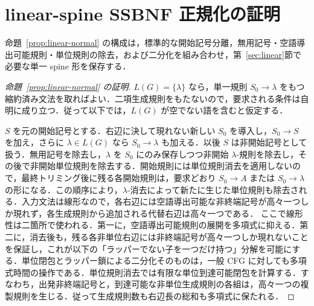 \documentclass[11pt,a4paper]{ltjsarticle}
\theoremstyle{remark}
\theoremstyle{plain}
\begin{document}
\section{linear-spine SSBNF 正規化の証明}
\label{app:linear-normalization}

命題~\ref{prop:linear-normal} の構成は，標準的な開始記号分離，無用記号・空語導出可能規則・単位規則の除去，および二分化を組み合わせ，第~\ref{sec:linear}節で必要な単一 spine 形を保存する．

\begin{proof}[命題~\ref{prop:linear-normal} の証明]
$L(G)=\{\lambda\}$ なら，単一規則 $S_0\to\lambda$ をもつ縮約済み文法を取ればよい．二項生成規則をもたないので，要求される条件は自明に成り立つ．従って以下では，$L(G)$ が空でない語を含むと仮定する．

$S$ を元の開始記号とする．右辺に決して現れない新しい $S_0$ を導入し，$S_0\to S$ を加え，さらに $\lambda\in L(G)$ なら $S_0\to\lambda$ も加える．以後 $S$ は非開始記号として扱う．無用記号を除去し，$\lambda$ を $S_0$ にのみ保存しつつ非開始 $\lambda$-規則を除去し，その後で非開始単位規則を除去する．開始規則には単位規則消去を適用しないので，最終トリミング後に残る各開始規則は，要求どおり $S_0\to A$ または $S_0\to\lambda$ の形になる．この順序により，$\lambda$-消去によって新たに生じた単位規則も除去される．入力文法は線形なので，各右辺には空語導出可能な非終端記号が高々一つしか現れず，各生成規則から追加される代替右辺は高々一つである．
ここで線形性は二箇所で使われる．第一に，空語導出可能規則の展開を多項式に抑える．第二に，消去後も，残る各非単位右辺には非終端記号が高々一つしか現れないことを保証し，これが以下の「ラッパーでない子を一つだけ持つ」分解を可能にする．単位閉包とラッパー鎖による二分化そのものは，一般 CFG に対しても多項式時間の操作である．単位規則消去では有限な単位到達可能閉包を計算する．すなわち，出発非終端記号と，到達可能な非単位生成規則の各組は，高々一つの複製規則を生じる．従って生成規則数も右辺長の総和も多項式に保たれる．


\end{proof}
\end{document}
